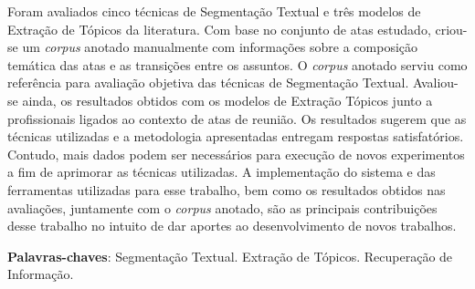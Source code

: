 \begin{resumo}
% 
% 
% 
% 
Foram avaliados cinco técnicas de Segmentação Textual e três modelos de Extração de Tópicos da literatura. Com base no conjunto de atas estudado, criou-se um \textit{corpus} anotado manualmente com informações sobre a composição temática das atas e as transições entre os assuntos. O \textit{corpus} anotado serviu como referência para avaliação objetiva das técnicas de Segmentação Textual. Avaliou-se ainda, os resultados obtidos com os modelos de Extração Tópicos junto a profissionais ligados ao contexto de atas de reunião.
% 
% 
% 
% 
Os resultados sugerem que as técnicas utilizadas e a metodologia apresentadas entregam respostas satisfatórios. Contudo, mais dados podem ser necessários para execução de novos experimentos a fim de aprimorar as técnicas utilizadas.
% 
% 
% 
% 
% 
A implementação do sistema e das ferramentas utilizadas para esse trabalho, bem como os resultados obtidos nas avaliações, juntamente com o \textit{corpus} anotado, são as principais contribuições desse trabalho no intuito de dar aportes ao desenvolvimento de novos trabalhos.
% 
% 
% 
% 
% 


\textbf{Palavras-chaves}: 
Segmentação Textual. 
Extração de Tópicos.
Recuperação de Informação. 

\end{resumo}


